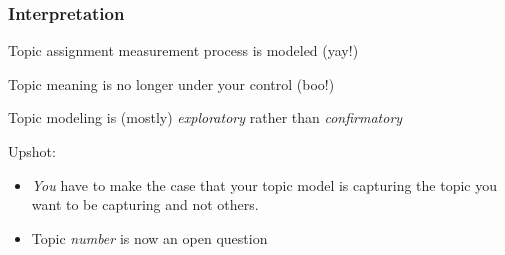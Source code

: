 \documentclass[11pt,compress,professionalfonts]{beamer}
\newcommand{\ita}{\begin{itemize}}
\newcommand{\itm}{\item[]}
\newcommand{\itz}{\end{itemize}}
\begin{document}
\begin{frame}[t]
%
%
%
%
%
%
%
%
%
%
%
%
%
%
%
%
%
%
%
%
%
%
%
%
%
%



\end{frame}
\begin{frame}[t]\frametitle{Interpretation}

Topic assignment measurement process is modeled  (yay!)

Topic meaning is no longer under your control (boo!)

Topic modeling is (mostly) \textit{exploratory} rather than \textit{confirmatory}

Upshot:
\ita
\itm \textit{You} have to make the case that your topic model is capturing the topic you want to be capturing and not others.
\itm Topic \textit{number} is now an open question
\itz

\end{frame}
\end{document}
